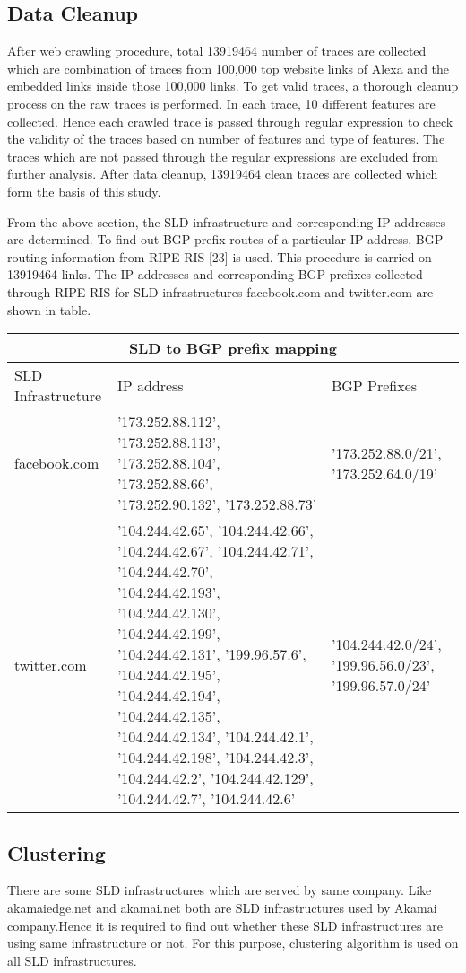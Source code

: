 \subsection{Data Cleanup}
After web crawling procedure, total 13919464 number of traces are collected which are combination of traces from 100,000 top website links of Alexa and the embedded links inside those 100,000 links. To get valid traces, a thorough cleanup process on the raw traces is performed. In each trace, 10 different features are collected. Hence each crawled trace is passed through regular expression to check the validity of the traces based on number of features and type of features. The traces which are not passed through the regular expressions are excluded from further analysis. After data cleanup, 13919464 clean traces are collected which form the basis of this study.

From the above section, the SLD infrastructure and corresponding IP addresses are determined. To find out BGP prefix routes of a particular IP address, BGP routing information from RIPE RIS [23] is used. This procedure is carried on 13919464 links. The IP addresses and corresponding BGP prefixes collected through RIPE RIS for SLD infrastructures facebook.com and twitter.com are shown in table.


\begin{tabular}{|p{3cm}||p{3cm}|p{3cm}| }
 \hline
 \multicolumn{3}{|c|}{SLD to BGP prefix mapping} \\
 \hline
 SLD Infrastructure     & IP address&BGP Prefixes\\
 \hline
 facebook.com   & '173.252.88.112', '173.252.88.113', '173.252.88.104', '173.252.88.66', '173.252.90.132', '173.252.88.73'    &'173.252.88.0/21', '173.252.64.0/19'\\
twitter.com&   '104.244.42.65', '104.244.42.66', '104.244.42.67', '104.244.42.71', '104.244.42.70', '104.244.42.193', '104.244.42.130', '104.244.42.199', '104.244.42.131', '199.96.57.6', '104.244.42.195', '104.244.42.194', '104.244.42.135', '104.244.42.134', '104.244.42.1', '104.244.42.198', '104.244.42.3', '104.244.42.2', '104.244.42.129', '104.244.42.7', '104.244.42.6'   &'104.244.42.0/24', '199.96.56.0/23', '199.96.57.0/24'\\
\hline
\end{tabular}
\newline

\subsection{Clustering}
There are some SLD infrastructures which are served by same company. Like akamaiedge.net and akamai.net both are SLD infrastructures used by Akamai company.Hence it is required to find out whether these SLD infrastructures are using same infrastructure or not. For this purpose, clustering algorithm is used on all SLD infrastructures.

